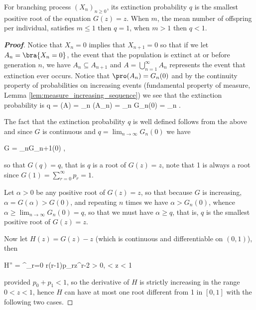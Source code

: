 \begin{theorem}
For branching process $(X_n)_{n\geq 0}$, its extinction probability $q$ is the smallest positive root of the equation $G(z) = z$. When $m$, the mean number of offspring per individual, satisfies $m \leq 1$ then $q = 1$,
when $m
> 1$ then $q < 1$.
\end{theorem}

\begin{proof}[\bf Proof]
Notice that $X_n = 0$ implies that $X_{n+1} = 0$ so that if we let $A_n = \bra{X_n = 0}$, the event that the population is extinct at or before generation $n$, we have $A_n \subseteq A_{n+1}$ and $A = \bigcup^\infty_{n=1}
A_n$ represents the event that extinction ever occurs. Notice that $\pro(A_n) = G_n(0)$ and by the continuity property of probabilities on increasing events (fundamental property of measure, Lemma
\ref{lem:measure_increasing_sequence}) we see that the extinction probability is \be q = \pro(A) = \lim_{n\to\infty} \pro (A_n) = \lim_{n\to\infty} G_n(0) = \lim_{n\to\infty} \pro {}. \ee

The fact that the extinction probability $q$ is well defined follows from the above and since $G$ is continuous and $q = \lim_{n\to \infty}G_n(0)$ we have

\be G = \lim_{n\to\infty}G_{n+1}(0) \ee,

so that $G(q) = q$, that is $q$ is a root of $G(z) = z$, note that 1 is always a root since $G(1) = \sum^\infty_{r=0} p_r = 1$.

Let $\alpha > 0$ be any positive root of $G(z) = z$, so that because $G$ is increasing, $\alpha = G(\alpha) > G(0)$, and repeating $n$ times we have $\alpha > G_n(0)$, whence $\alpha \geq \lim_{n\to\infty} G_n(0) = q$, so
that we must have $\alpha\geq q$, that is, $q$ is the smallest positive root of $G(z) = z$.

Now let $H(z) = G(z)-z$ (which is continuous and differentiable on $(0,1)$), then

\be H'' = \sum^\infty_{r=0} r(r-1)p_rz^{r-2} > 0, < z < 1 \ee

provided $p_0 + p_1 < 1$, so the derivative of $H$ is strictly increasing in the range $0 < z < 1$, hence $H$ can have at most one root different from 1 in $[0, 1]$ with the following two cases.%



\end{proof}

